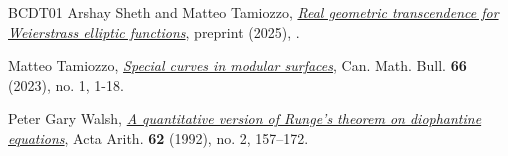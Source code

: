 \documentclass[11pt,reqno]{amsart}
\theoremstyle{definition}
\numberwithin{equation}{section}
\begin{document}
\begin{thebibliography}{BCDT01}
Arshay Sheth and Matteo Tamiozzo, \href{https://arxiv.org/abs/2508.14645}{\emph{Real geometric transcendence for Weierstrass elliptic functions}}, preprint (2025), . 


Matteo Tamiozzo, \href{https://www.cambridge.org/core/journals/canadian-mathematical-bulletin/article/abs/special-curves-in-modular-surfaces/E327F297E517F193F470C7D305DA41A6}{\emph{Special curves in modular surfaces}}, Can. Math. Bull. \textbf{66} (2023), no. 1, 1-18.  

Peter Gary Walsh,  \href{http://matwbn.icm.edu.pl/ksiazki/aa/aa62/aa6225.pdf}{\emph{A quantitative version of Runge’s theorem
on diophantine equations}}, Acta Arith. \textbf{62} (1992), no. 2, 157–172. 


\end{thebibliography}
\end{document}
